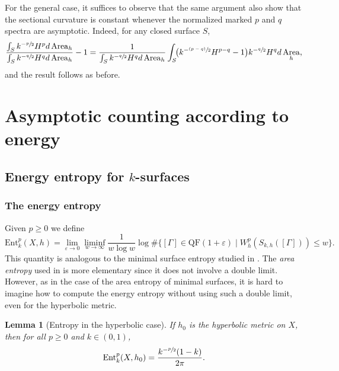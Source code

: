\documentclass[11pt]{article}
\newcommand{\Subsection}{\subsection}
\newcommand{\psfrac}[2]{\sfrac{(#1)}{#2}}
\newcommand{\ksurfaces}{$k$\nobreakdash-surfaces\xspace}
\theoremstyle{plain}
\newtheorem{lemma}[theorem]{Lemma}
\theoremstyle{definition}
\let\eps\varepsilon
\newcommand{\Ent}{\mathrm{Ent}}
\newcommand{\QF}{\mathrm{QF}}
\DeclareMathOperator{\Area}{Area}
\begin{document}
For the general case, it suffices to observe that the same argument also show that the sectional curvature is constant whenever the normalized marked $p$ and $q$ spectra are asymptotic. Indeed, for any closed surface $S$,
\[
\frac{\int_S k^{-\sfrac{p}{2}}H^p d\Area_h}{\int_S k^{-\sfrac{q}{2}}H^qd\Area_h}-1
=\frac{1}{\int_Sk^{-\sfrac{q}{2}}H^qd\Area_h}\int_S\!\bigl(k^{-\psfrac{p-q}{2}}H^{p-q}-1\bigr)k^{-\sfrac{q}{2}} H^qd\Area_h,
\]
and the result follows as before.

\section{Asymptotic counting according to energy}
\Subsection{Energy entropy for \ksurfaces}
\subsubsection{The energy entropy} Given $p\geq 0$ we define
\begin{equation*}
\Ent^p_{k}(X,h)=\lim_{\eps\to 0}\liminf_{w\to\infty}\frac{1}{w\log w}\log\#\bigl\{[\Gamma]\in\QF(1+\eps)\mid W^{p}_{h}(S_{k,h}([\Gamma]))\leq w\bigr\}.
\end{equation*}
This quantity is analogous to the minimal surface entropy studied in \cite{CMN,ln21}. The \emph{area entropy} used in \cite{ALS} is more elementary since it does not involve a double limit. However, as in the case of the area entropy of minimal surfaces, it is hard to imagine how to compute the energy entropy without using such a double limit, even for the hyperbolic metric.

\begin{lemma}[Entropy in the hyperbolic case] If $h_0$ is the hyperbolic metric on $X$, then for all $p\geq 0$ and $k\in(0,1)$,
\begin{equation*}
\Ent^p_{k}(X,h_0)=\frac{k^{-\sfrac{p}{2}}(1-k)}{2\pi}.
\end{equation*}
\end{lemma}
\end{document}

